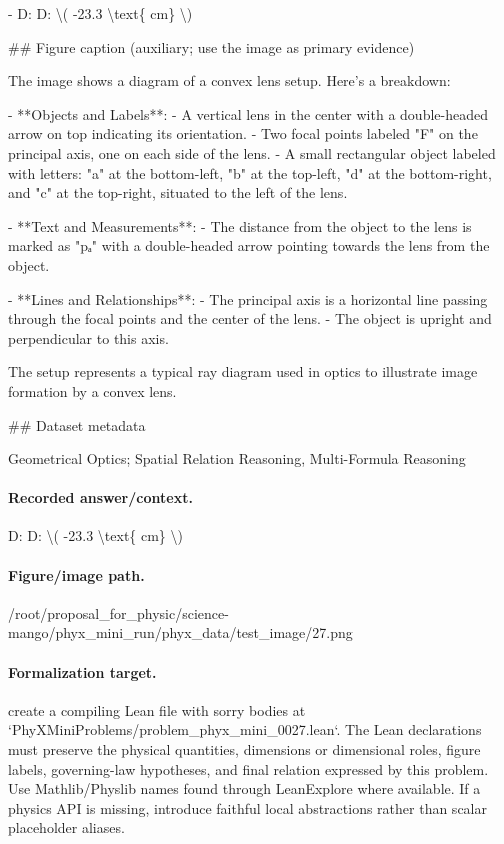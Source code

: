 - D: D: \textbackslash{}( -23.3 \textbackslash{}text\{ cm\} \textbackslash{})

\#\# Figure caption (auxiliary; use the image as primary evidence)

The image shows a diagram of a convex lens setup. Here's a breakdown:

- **Objects and Labels**:
  - A vertical lens in the center with a double-headed arrow on top indicating its orientation.
  - Two focal points labeled "F" on the principal axis, one on each side of the lens.
  - A small rectangular object labeled with letters: "a" at the bottom-left, "b" at the top-left, "d" at the bottom-right, and "c" at the top-right, situated to the left of the lens.

- **Text and Measurements**:
  - The distance from the object to the lens is marked as "pₐ" with a double-headed arrow pointing towards the lens from the object.

- **Lines and Relationships**:
  - The principal axis is a horizontal line passing through the focal points and the center of the lens.
  - The object is upright and perpendicular to this axis.

The setup represents a typical ray diagram used in optics to illustrate image formation by a convex lens.

\#\# Dataset metadata

Geometrical Optics; Spatial Relation Reasoning, Multi-Formula Reasoning

\paragraph{Recorded answer/context.}
D: D: \textbackslash{}( -23.3 \textbackslash{}text\{ cm\} \textbackslash{})

\paragraph{Figure/image path.}
/root/proposal\_for\_physic/science-mango/phyx\_mini\_run/phyx\_data/test\_image/27.png

\paragraph{Formalization target.}
create a compiling Lean file with sorry bodies at `PhyXMiniProblems/problem\_phyx\_mini\_0027.lean`. The Lean declarations must preserve the physical quantities, dimensions or dimensional roles, figure labels, governing-law hypotheses, and final relation expressed by this problem.
Use Mathlib/Physlib names found through LeanExplore where available. If a physics API is missing, introduce faithful local abstractions rather than scalar placeholder aliases.

